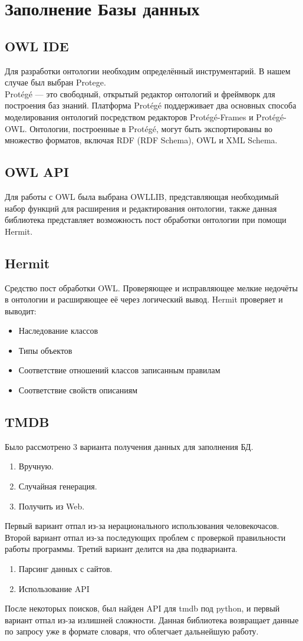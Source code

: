 \section{Заполнение Базы данных}
\subsection{OWL IDE}
Для разработки онтологии необходим определённый инструментарий. В нашем случае был выбран Protege.\\
Protégé — это свободный, открытый редактор онтологий и фреймворк для построения баз знаний.
Платформа Protégé поддерживает два основных способа моделирования онтологий посредством редакторов Protégé-Frames и Protégé-OWL. Онтологии, построенные в Protégé, могут быть экспортированы во множество форматов, включая RDF (RDF Schema), OWL и XML Schema.
\subsection{OWL API}
Для работы с OWL была выбрана OWLLIB, представляющая необходимый набор функций для расширения и редактирования онтологии, также данная библиотека представляет возможность пост обработки онтологии при помощи Hermit.
\subsection{Hermit}
Средство пост обработки OWL. Проверяющее и исправляющее мелкие недочёты в онтологии и расширяющее её через логический вывод.
Hermit проверяет и выводит:
\begin{itemize}
\item Наследование классов
\item Типы объектов
\item Соответствие отношений классов записанным правилам
\item Соответствие свойств описаниям
\end{itemize}

\subsection{TMDB}
Было рассмотрено 3 варианта получения данных для заполнения БД.
\begin{enumerate}
\item Вручную.
\item Случайная генерация.
\item Получить из Web.
\end{enumerate}
Первый вариант отпал из-за нерационального использования человекочасов. Второй вариант отпал из-за последующих проблем с проверкой правильности работы программы. Третий вариант делится на два подварианта.\\
\begin{enumerate}
\item Парсинг данных с сайтов.
\item Использование API
\end{enumerate}
После некоторых поисков, был найден API для tmdb под python, и первый вариант отпал из-за излишней сложности. Данная библиотека возвращает данные по запросу уже в формате словаря, что облегчает дальнейшую работу.

